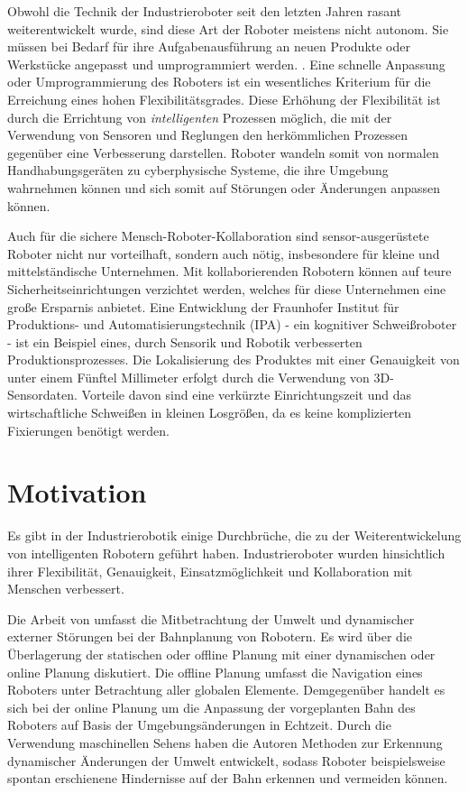 Obwohl die Technik der Industrieroboter seit den letzten Jahren rasant weiterentwickelt wurde, sind diese Art der Roboter  meistens nicht autonom. Sie müssen bei Bedarf für ihre Aufgabenausführung an neuen Produkte oder Werkstücke angepasst und umprogrammiert werden. \autocite{maier2016grundlagen}. Eine schnelle Anpassung oder Umprogrammierung des Roboters ist ein wesentliches Kriterium für die Erreichung eines hohen Flexibilitätsgrades. Diese Erhöhung der Flexibilität ist durch die Errichtung von \emph{intelligenten} Prozessen möglich, die mit der Verwendung von Sensoren und Reglungen den herkömmlichen Prozessen gegenüber eine Verbesserung darstellen. Roboter wandeln somit von normalen Handhabungsgeräten zu cyberphysische Systeme, die ihre Umgebung wahrnehmen können und sich somit auf Störungen oder Änderungen anpassen können. \autocite{MeyerChristian2007RaSd}
\autocite{HägeleMartinFraunhoferIPA2016SfdP}

Auch für die sichere Mensch-Roboter-Kollaboration sind sensor-ausgerüstete Roboter nicht nur vorteilhaft, sondern auch nötig, insbesondere für kleine und mittelständische Unternehmen. Mit kollaborierenden Robotern können auf teure Sicherheitseinrichtungen verzichtet werden, welches für diese Unternehmen eine große Ersparnis anbietet. Eine Entwicklung der Fraunhofer Institut für Produktions- und Automatisierungstechnik (IPA) - ein kognitiver Schweißroboter - ist ein Beispiel eines, durch Sensorik und Robotik verbesserten Produktionsprozesses. Die Lokalisierung des Produktes mit einer Genauigkeit von unter einem Fünftel Millimeter erfolgt durch die Verwendung von 3D-Sensordaten. Vorteile davon sind eine verkürzte Einrichtungszeit und das wirtschaftliche Schweißen in kleinen Losgrößen, da es keine komplizierten Fixierungen benötigt werden. \autocite{HägeleMartinFraunhoferIPA2016SfdP}

\section{Motivation} \label{sec:motivation}
Es gibt in der Industrierobotik einige Durchbrüche, die zu der Weiterentwickelung von intelligenten Robotern geführt haben. Industrieroboter wurden hinsichtlich ihrer Flexibilität, Genauigkeit, Einsatzmöglichkeit und Kollaboration mit Menschen verbessert.

Die Arbeit von \textcite{Liu2022} umfasst die Mitbetrachtung der Umwelt und dynamischer externer Störungen bei der Bahnplanung von Robotern. Es wird über die Überlagerung der statischen oder offline Planung mit einer dynamischen oder online Planung diskutiert. Die offline Planung umfasst die Navigation eines Roboters unter Betrachtung aller globalen Elemente. Demgegenüber handelt es sich bei der online Planung um die Anpassung der vorgeplanten Bahn des Roboters auf Basis der Umgebungsänderungen in Echtzeit. Durch die Verwendung maschinellen Sehens haben die Autoren Methoden zur Erkennung dynamischer Änderungen der Umwelt entwickelt, sodass Roboter beispielsweise spontan erschienene Hindernisse auf der Bahn erkennen und vermeiden können. 

